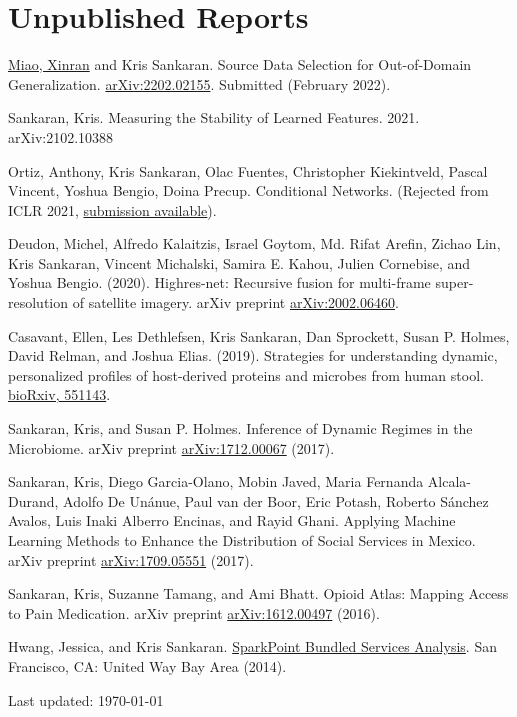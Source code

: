 \documentclass[letterpaper]{article}
\def\footerlink{}
\renewenvironment{itemize}{
  \begin{list}{}{
    \setlength{\leftmargin}{1.5em}
  }
}{
  \end{list}
}
\begin{document}
\section*{Unpublished Reports}
\begin{itemize}
\item \underline{Miao, Xinran} and Kris Sankaran. Source Data Selection for
Out-of-Domain Generalization.
\href{https://arxiv.org/abs/2202.02155}{arXiv:2202.02155}. Submitted (February
2022).
\item Sankaran, Kris. Measuring the Stability of Learned Features. 2021.
arXiv:2102.10388
\item Ortiz, Anthony, Kris Sankaran, Olac Fuentes, Christopher Kiekintveld,
  Pascal Vincent, Yoshua Bengio, Doina Precup. Conditional Networks. (Rejected
  from ICLR 2021, \href{https://openreview.net/forum?id=h8q8iZi-ks}{submission
    available}).
\item Deudon, Michel, Alfredo Kalaitzis, Israel Goytom, Md. Rifat Arefin, Zichao
  Lin, Kris Sankaran, Vincent Michalski, Samira E. Kahou, Julien Cornebise, and
  Yoshua Bengio. (2020). Highres-net: Recursive fusion for multi-frame
  super-resolution of satellite imagery. arXiv preprint
  \href{https://arxiv.org/abs/2002.06460}{arXiv:2002.06460}.
\item Casavant, Ellen, Les Dethlefsen, Kris Sankaran, Dan Sprockett, Susan P.
  Holmes, David Relman, and Joshua Elias. (2019). Strategies for understanding
  dynamic, personalized profiles of host-derived proteins and microbes from
  human stool. \href{https://www.biorxiv.org/content/10.1101/551143v1}{bioRxiv, 551143}.
 \item Sankaran, Kris, and Susan P. Holmes. Inference of Dynamic Regimes in the
   Microbiome. arXiv preprint \href{https://arxiv.org/abs/1712.00067}{arXiv:1712.00067} (2017).
\item Sankaran, Kris, Diego Garcia-Olano, Mobin Javed, Maria Fernanda
  Alcala-Durand, Adolfo De Unánue, Paul van der Boor, Eric Potash, Roberto
  S\'anchez Avalos, Luis Inaki Alberro Encinas, and Rayid Ghani. Applying
  Machine Learning Methods to Enhance the Distribution of Social Services in
  Mexico. arXiv preprint \href{https://arxiv.org/abs/1709.05551}{arXiv:1709.05551} (2017).
\item Sankaran, Kris, Suzanne Tamang, and Ami Bhatt. Opioid Atlas: Mapping
  Access to Pain Medication. arXiv preprint
  \href{https://arxiv.org/abs/1612.00497}{arXiv:1612.00497} (2016). \item Hwang,
  Jessica, and Kris Sankaran.
\href{https://uwba.org/wp-content/uploads/2022/04/UnitedWay_BayArea_2014_SparkPoint_Bundle_Services_FINAL.pdf}{SparkPoint
Bundled Services Analysis}. San Francisco, CA: United Way Bay Area (2014).
\end{itemize}


\begin{center}
  \begin{footnotesize}
    Last updated: \today \\
    \href{\footerlink}{\texttt{\footerlink}}
  \end{footnotesize}
\end{center}
\end{document}
